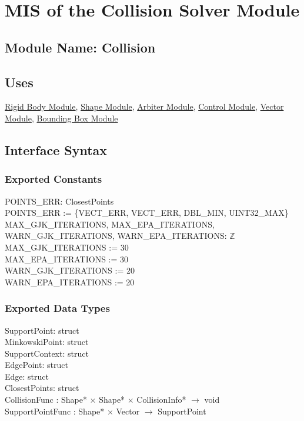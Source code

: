 \documentclass[12pt]{article}
\newcommand{\Z}{$\mathbb{Z}$}
\newcommand{\Body}{\hyperref[MISBody]{Rigid Body Module}}
\newcommand{\Shape}{\hyperref[MISShape]{Shape Module}}
\newcommand{\Arbiter}{\hyperref[MISArbiter]{Arbiter Module}}
\newcommand{\Control}{\hyperref[MISControl]{Control Module}}
\newcommand{\Vector}{\hyperref[MISVector]{Vector Module}}
\newcommand{\BB}{\hyperref[MISBB]{Bounding Box Module}}
\begin{document}

\section{MIS of the Collision Solver Module} \label{MISCollision}

\subsection{Module Name: Collision}

\subsection{Uses} \label{SecUCollision}
	\Body, \Shape, \Arbiter, \Control, \Vector, \BB

\subsection{Interface Syntax}

\subsubsection{Exported Constants} \label{SecECCollision}
	POINTS_ERR: ClosestPoints \\
	POINTS_ERR := \{VECT_ERR, VECT_ERR, DBL_MIN, UINT32_MAX\} \\
	\newline
	MAX_GJK_ITERATIONS, MAX_EPA_ITERATIONS, WARN_GJK_ITERATIONS, WARN_EPA_ITERATIONS: \Z \\
	MAX_GJK_ITERATIONS := 30 \\
	MAX_EPA_ITERATIONS := 30 \\
	WARN_GJK_ITERATIONS := 20 \\
	WARN_EPA_ITERATIONS := 20


\subsubsection{Exported Data Types} \label{SecEDTCollision}
	SupportPoint: struct \\
	MinkowskiPoint: struct \\
	SupportContext: struct \\
	EdgePoint: struct \\
	Edge: struct \\
	ClosestPoints: struct \\
	CollisionFunc : Shape* $\times$ Shape* $\times$ CollisionInfo* $\to$ void \\
	SupportPointFunc : Shape* $\times$ Vector $\to$ SupportPoint
\end{document}
